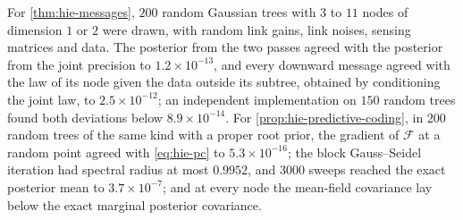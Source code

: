 \begin{numcheck}\label{chk:hie-messages}
For \cref{thm:hie-messages}, $200$ random Gaussian trees with $3$ to $11$ nodes of dimension $1$ or $2$ were drawn, with random link gains, link noises, sensing matrices and data. The posterior from the two passes agreed with the posterior from the joint precision to $1.2\times10^{-13}$, and every downward message agreed with the law of its node given the data outside its subtree, obtained by conditioning the joint law, to $2.5\times10^{-12}$; an independent implementation on $150$ random trees found both deviations below $8.9\times10^{-14}$. For \cref{prop:hie-predictive-coding}, in $200$ random trees of the same kind with a proper root prior, the gradient of $\mathcal F$ at a random point agreed with \eqref{eq:hie-pc} to $5.3\times10^{-16}$; the block Gauss--Seidel iteration had spectral radius at most $0.9952$, and $3000$ sweeps reached the exact posterior mean to $3.7\times10^{-7}$; and at every node the mean-field covariance lay below the exact marginal posterior covariance.
\end{numcheck}


